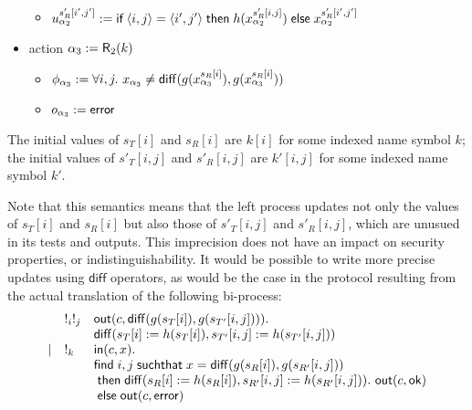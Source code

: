 \begin{example}[OSK]
\begin{itemize}
\begin{itemize}
          \item $u_{\alpha_2}^{s'_R[i',j']} :=
            \textsf{if}\;\langle i,j\rangle=\langle i',j'\rangle \;\textsf{then}\;
            h(x_{\alpha_2}^{s'_R[i,j]})
            \;\textsf{else}\; x_{\alpha_2}^{s'_R[i',j']}$
        \end{itemize}
      \item action $\alpha_3 := \textsf{R}_2(k)$
        \begin{itemize}
          \item $\phi_{\alpha_3} :=
            \forall i,j.~
            x_{\alpha_3} \neq
            \mathsf{diff}(g(x_{\alpha_3}^{s_R[i]}),g(x_{\alpha_3}^{s_R[i]}))$
          \item $o_{\alpha_3} := \mathsf{error}$
        \end{itemize}
    \end{itemize}
    The initial values of $s_T[i]$ and $s_R[i]$ are $k[i]$ for
    some indexed name symbol $k$; the initial values of
    $s'_T[i,j]$ and $s'_R[i,j]$ are $k'[i,j]$ for some
    indexed name symbol $k'$.

    Note that this semantics means that the left process updates not only
    the values of $s_T[i]$ and $s_R[i]$ but also those of
    $s'_T[i,j]$ and $s'_R[i,j]$, which are unusued in its tests and outputs.
    This imprecision does not have an impact on security properties,
    or indistinguishability.
    It would be possible to write more precise updates using $\mathsf{diff}$
    operators, as would be the case in the protocol resulting from the actual
    translation of the following bi-process:
  \[
  \begin{array}{lll}
  & !_i !_j & \mathsf{out}(c,\mathsf{diff}(g(s_T[i]),g(s_{T'}[i,j]))). \\
  && \mathsf{diff}(s_T[i] := h(s_T[i]),s_{T'}[i,j] := h(s_{T'}[i,j])) \\
  \mid
  & !_k & \mathsf{in}(c,x). \\
  && \textsf{find}\; i,j \;\textsf{suchthat}\; x = \mathsf{diff}(g(s_R[i]),g(s_{R'}[i,j])) \\
  && \;\textsf{then}\; \mathsf{diff}(s_R[i] := h(s_R[i]),s_{R'}[i,j] := h(s_{R'}[i,j])) .~\mathsf{out}(c,\mathsf{ok}) \\
  && \;\textsf{else}\; \mathsf{out}(c,\mathsf{error}) \\
  &  & \\
  \end{array}
  \]
\end{example}
